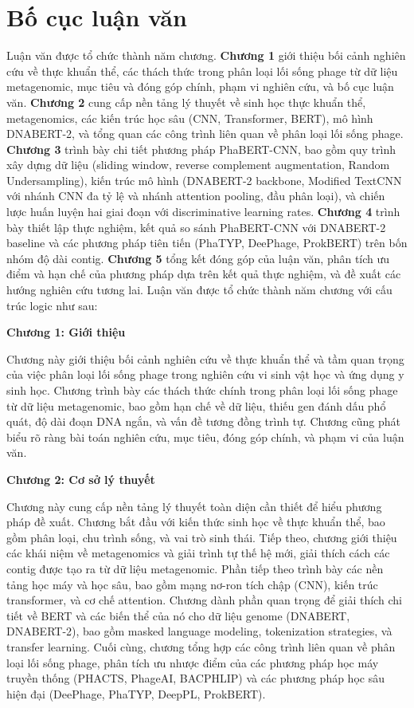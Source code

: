 \section{Bố cục luận văn}
\label{sec:organization}

Luận văn được tổ chức thành năm chương. \textbf{Chương 1} giới thiệu bối cảnh nghiên cứu về thực khuẩn thể, các thách thức trong phân loại lối sống phage từ dữ liệu metagenomic, mục tiêu và đóng góp chính, phạm vi nghiên cứu, và bố cục luận văn. \textbf{Chương 2} cung cấp nền tảng lý thuyết về sinh học thực khuẩn thể, metagenomics, các kiến trúc học sâu (CNN, Transformer, BERT), mô hình DNABERT-2, và tổng quan các công trình liên quan về phân loại lối sống phage. \textbf{Chương 3} trình bày chi tiết phương pháp PhaBERT-CNN, bao gồm quy trình xây dựng dữ liệu (sliding window, reverse complement augmentation, Random Undersampling), kiến trúc mô hình (DNABERT-2 backbone, Modified TextCNN với nhánh CNN đa tỷ lệ và nhánh attention pooling, đầu phân loại), và chiến lược huấn luyện hai giai đoạn với discriminative learning rates. \textbf{Chương 4} trình bày thiết lập thực nghiệm, kết quả so sánh PhaBERT-CNN với DNABERT-2 baseline và các phương pháp tiên tiến (PhaTYP, DeePhage, ProkBERT) trên bốn nhóm độ dài contig. \textbf{Chương 5} tổng kết đóng góp của luận văn, phân tích ưu điểm và hạn chế của phương pháp dựa trên kết quả thực nghiệm, và đề xuất các hướng nghiên cứu tương lai.
Luận văn được tổ chức thành năm chương với cấu trúc logic như sau:

\textbf{Chương 1: Giới thiệu}

Chương này giới thiệu bối cảnh nghiên cứu về thực khuẩn thể và tầm quan trọng của việc phân loại lối sống phage trong nghiên cứu vi sinh vật học và ứng dụng y sinh học. Chương trình bày các thách thức chính trong phân loại lối sống phage từ dữ liệu metagenomic, bao gồm hạn chế về dữ liệu, thiếu gen đánh dấu phổ quát, độ dài đoạn DNA ngắn, và vấn đề tương đồng trình tự. Chương cũng phát biểu rõ ràng bài toán nghiên cứu, mục tiêu, đóng góp chính, và phạm vi của luận văn.

\textbf{Chương 2: Cơ sở lý thuyết}

Chương này cung cấp nền tảng lý thuyết toàn diện cần thiết để hiểu phương pháp đề xuất. Chương bắt đầu với kiến thức sinh học về thực khuẩn thể, bao gồm phân loại, chu trình sống, và vai trò sinh thái. Tiếp theo, chương giới thiệu các khái niệm về metagenomics và giải trình tự thế hệ mới, giải thích cách các contig được tạo ra từ dữ liệu metagenomic. Phần tiếp theo trình bày các nền tảng học máy và học sâu, bao gồm mạng nơ-ron tích chập (CNN), kiến trúc transformer, và cơ chế attention. Chương dành phần quan trọng để giải thích chi tiết về BERT và các biến thể của nó cho dữ liệu genome (DNABERT, DNABERT-2), bao gồm masked language modeling, tokenization strategies, và transfer learning. Cuối cùng, chương tổng hợp các công trình liên quan về phân loại lối sống phage, phân tích ưu nhược điểm của các phương pháp học máy truyền thống (PHACTS, PhageAI, BACPHLIP) và các phương pháp học sâu hiện đại (DeePhage, PhaTYP, DeepPL, ProkBERT).

